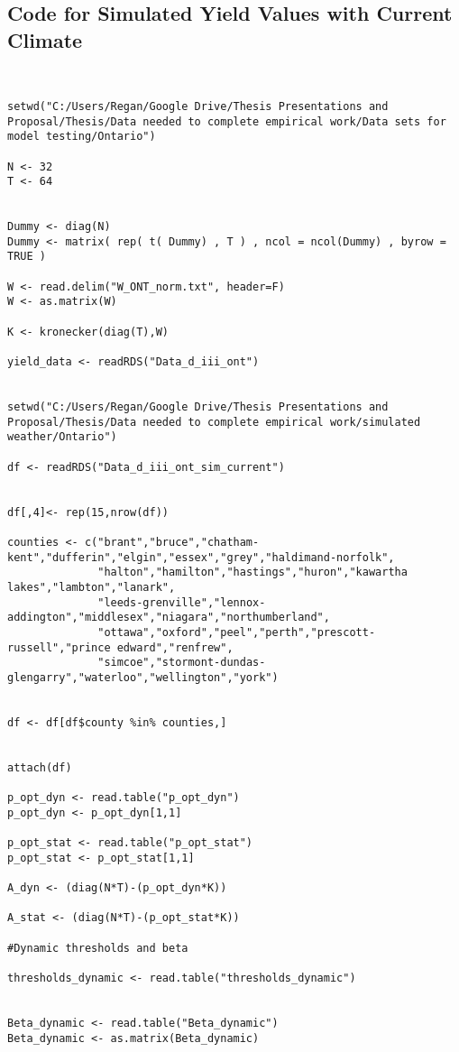 \subsection{Code for Simulated Yield Values with Current Climate}

\begin{lstlisting}


setwd("C:/Users/Regan/Google Drive/Thesis Presentations and Proposal/Thesis/Data needed to complete empirical work/Data sets for model testing/Ontario")

N <- 32
T <- 64


Dummy <- diag(N)
Dummy <- matrix( rep( t( Dummy) , T ) , ncol = ncol(Dummy) , byrow = TRUE )

W <- read.delim("W_ONT_norm.txt", header=F)
W <- as.matrix(W)

K <- kronecker(diag(T),W)

yield_data <- readRDS("Data_d_iii_ont")


setwd("C:/Users/Regan/Google Drive/Thesis Presentations and Proposal/Thesis/Data needed to complete empirical work/simulated weather/Ontario")

df <- readRDS("Data_d_iii_ont_sim_current")


df[,4]<- rep(15,nrow(df))

counties <- c("brant","bruce","chatham-kent","dufferin","elgin","essex","grey","haldimand-norfolk",
              "halton","hamilton","hastings","huron","kawartha lakes","lambton","lanark",
              "leeds-grenville","lennox-addington","middlesex","niagara","northumberland",
              "ottawa","oxford","peel","perth","prescott-russell","prince edward","renfrew",
              "simcoe","stormont-dundas-glengarry","waterloo","wellington","york")


df <- df[df$county %in% counties,]


attach(df)

p_opt_dyn <- read.table("p_opt_dyn")
p_opt_dyn <- p_opt_dyn[1,1]

p_opt_stat <- read.table("p_opt_stat")
p_opt_stat <- p_opt_stat[1,1]

A_dyn <- (diag(N*T)-(p_opt_dyn*K))

A_stat <- (diag(N*T)-(p_opt_stat*K))

#Dynamic thresholds and beta

thresholds_dynamic <- read.table("thresholds_dynamic")


Beta_dynamic <- read.table("Beta_dynamic")
Beta_dynamic <- as.matrix(Beta_dynamic)


\end{lstlisting}
